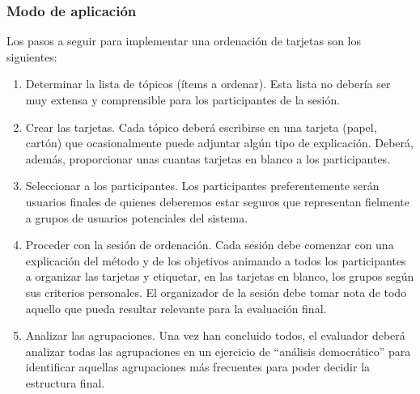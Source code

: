 \subsubsection{Modo de aplicación}
Los pasos a seguir para implementar una ordenación de tarjetas son los siguientes:
\begin{enumerate}
    \item Determinar la lista de tópicos (ítems a ordenar). Esta lista no debería ser muy extensa y comprensible para los participantes de la sesión.
    \item Crear las tarjetas. Cada tópico deberá escribirse en una tarjeta (papel, cartón) que ocasionalmente puede adjuntar algún tipo de explicación. Deberá, además, proporcionar unas cuantas tarjetas en blanco a los participantes.
    \item Seleccionar a los participantes. Los participantes preferentemente serán usuarios finales de quienes deberemos estar seguros que representan fielmente a grupos de usuarios potenciales del sistema.
    \item Proceder con la sesión de ordenación. Cada sesión debe comenzar con una explicación del método y de los objetivos animando a todos los participantes a organizar las tarjetas y etiquetar, en las tarjetas en blanco, los grupos según sus criterios personales. El organizador de la sesión debe tomar nota de todo aquello que pueda resultar relevante para la evaluación final.
    \item Analizar las agrupaciones. Una vez han concluido todos, el evaluador deberá analizar todas las agrupaciones en un ejercicio de “análisis democrático” para identificar aquellas agrupaciones más frecuentes para poder decidir la estructura final.
\end{enumerate}